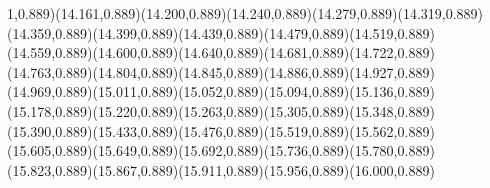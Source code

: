 \documentclass[smallextended]{svjour3}
\begin{document}
1,0.889)(14.161,0.889)(14.200,0.889)(14.240,0.889)(14.279,0.889)(14.319,0.889)(14.359,0.889)(14.399,0.889)(14.439,0.889)(14.479,0.889)(14.519,0.889)(14.559,0.889)(14.600,0.889)(14.640,0.889)(14.681,0.889)(14.722,0.889)(14.763,0.889)(14.804,0.889)(14.845,0.889)(14.886,0.889)(14.927,0.889)(14.969,0.889)(15.011,0.889)(15.052,0.889)(15.094,0.889)(15.136,0.889)(15.178,0.889)(15.220,0.889)(15.263,0.889)(15.305,0.889)(15.348,0.889)(15.390,0.889)(15.433,0.889)(15.476,0.889)(15.519,0.889)(15.562,0.889)(15.605,0.889)(15.649,0.889)(15.692,0.889)(15.736,0.889)(15.780,0.889)(15.823,0.889)(15.867,0.889)(15.911,0.889)(15.956,0.889)(16.000,0.889)

\end{document}
